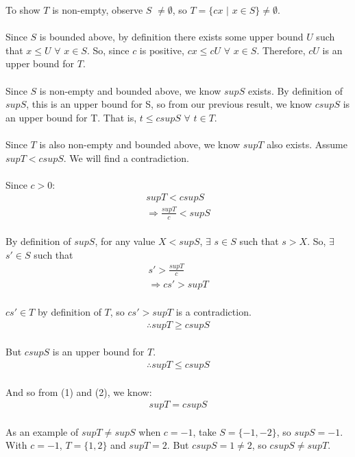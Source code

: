 \documentclass{article}
\begin{document}
\solution
To show \(T\) is non-empty, observe \(S\) \(\neq \emptyset\), so \(T = \{cx\) \(|\) \(x \in S\} \neq \emptyset\).
\\
\\
Since \(S\) is bounded above, by definition there exists some upper bound \(U\) such that \(x \leq U\) \(\forall\) \(x \in S\). So, since \(c\) is positive, \(cx \leq cU\) \(\forall\) \(x \in S\). Therefore, \(cU\) is an upper bound for \(T\).
\\
\\
Since \(S\) is non-empty and bounded above, we know \(supS\) exists. By definition of \(supS\), this is an upper bound for S, so from our previous result, we know \(csupS\) is an upper bound for T. That is, \(t \leq csupS\) \(\forall\) \(t \in T\).
\\
\\
Since \(T\) is also non-empty and bounded above, we know \(supT\) also exists. Assume \(supT < csupS\). We will find a contradiction.
\\
\\
Since \(c > 0\):
\begin{align}
  \label{}
  supT < csupS \nonumber \\
  \Rightarrow \frac{supT}{c} < supS\nonumber
\end{align}
\\
By definition of \(supS\), for any value \(X < supS\), \(\exists\) \(s \in S\) such that \(s>X\). So, \(\exists\) \(s' \in S\) such that
\begin{align}
  \label{}
  s' > \frac{supT}{c} \nonumber \\
  \Rightarrow cs' > supT \nonumber
\end{align}
\\
\(cs' \in T\) by definition of \(T\), so \(cs' > supT\) is a contradiction.
\\
\begin{align}
  \label{}
  \therefore supT \geq csupS
\end{align}
\\
But \(csupS\) is an upper bound for \(T\).
\begin{align}
  \label{}
  \therefore supT \leq csupS
\end{align}
\\
And so from (1) and (2), we know:
\begin{align}
  \label{}
  supT = csupS \nonumber
\end{align}
\\
As an example of \(supT \neq supS\) when \(c=-1\), take \(S = \{-1,-2\}\), so \(supS = -1\). With \(c=-1\), \(T = \{1,2\}\) and \(supT = 2\). But \(csupS = 1 \neq 2\), so \(csupS \neq supT\).
\\\\\\
\end{document}
